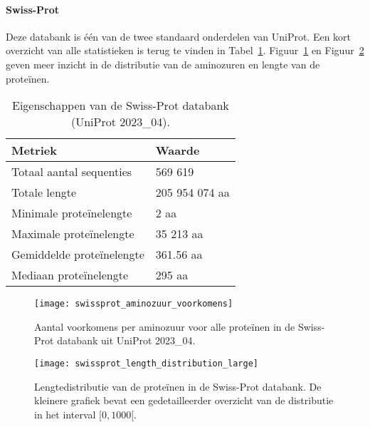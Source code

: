 \paragraph{Swiss-Prot} Deze databank is één van de twee standaard onderdelen van UniProt.
Een kort overzicht van alle statistieken is terug te vinden in Tabel~\ref{tab:swissprot_eigenschappen}.
Figuur~\ref{fig:swissprot_aminozuur} en Figuur~\ref{fig:swissprot_length} geven meer inzicht in de distributie van de aminozuren en lengte van de proteïnen.

\begin{table}[h]
    \centering
    \begin{tabular}{l l}
        Metriek                   & Waarde         \\
        \hline\hline
        Totaal aantal sequenties  & 569 619        \\
        Totale lengte             & 205 954 074 aa \\
        Minimale proteïnelengte   & 2 aa           \\
        Maximale proteïnelengte   & 35 213 aa      \\
        Gemiddelde proteïnelengte & 361.56 aa      \\
        Mediaan proteïnelengte    & 295 aa         \\
        \hline
    \end{tabular}
    \caption{Eigenschappen van de Swiss-Prot databank (UniProt 2023\_04).}
    \label{tab:swissprot_eigenschappen}
\end{table}


\begin{figure}[h]
    \centering
    \texttt{[image: swissprot\_aminozuur\_voorkomens]}
    \caption{Aantal voorkomens per aminozuur voor alle proteïnen in de Swiss-Prot databank uit UniProt 2023\_04.}
    \label{fig:swissprot_aminozuur}
\end{figure}

\begin{figure}[h]
    \centering
    \texttt{[image: swissprot\_length\_distribution\_large]}
    \caption{Lengtedistributie van de proteïnen in de Swiss-Prot databank. De kleinere grafiek bevat een gedetailleerder overzicht van de distributie in het interval $[0, 1000[$.}\label{fig:swissprot_length}
\end{figure}

